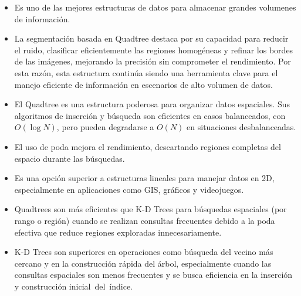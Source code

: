 \documentclass[9pt,a4paper,twoside]{rho-class/rho}
\begin{document}
        \begin{itemize}
            \item Es uno de las mejores estructuras de datos para almacenar grandes volumenes de información.
            \item La segmentación basada en Quadtree destaca por su capacidad para reducir el ruido, clasificar eficientemente las regiones homogéneas y refinar los bordes de las imágenes, mejorando la precisión sin comprometer el rendimiento. Por esta razón, esta estructura continúa siendo una herramienta clave para el manejo eficiente de información en escenarios de alto volumen de datos.
            \item El Quadtree es una estructura poderosa para organizar datos espaciales. Sus algoritmos de inserción y búsqueda son eficientes en casos balanceados, con $O(\log N)$, pero pueden degradarse a $O(N)$ en situaciones desbalanceadas.
            \item El uso de poda mejora el rendimiento, descartando regiones completas del espacio durante las búsquedas.
            \item Es una opción superior a estructuras lineales para manejar datos en 2D, especialmente en aplicaciones como GIS, gráficos y videojuegos.
            \item Quadtrees son más eficientes que K-D Trees para búsquedas espaciales (por rango o región) cuando se realizan consultas frecuentes debido a la poda efectiva que reduce regiones exploradas innecesariamente.
            \item K-D Trees son superiores en operaciones como búsqueda del vecino más cercano y en la construcción rápida del árbol, especialmente cuando las consultas espaciales son menos frecuentes y se busca eficiencia en la inserción y construcción inicial del índice.\\
        \end{itemize}
    
    \printbibliography
 
    \renewcommand{\contentsname}{Tabla de Contenidos}
    \tableofcontents
    \linenumbers


\end{document}

